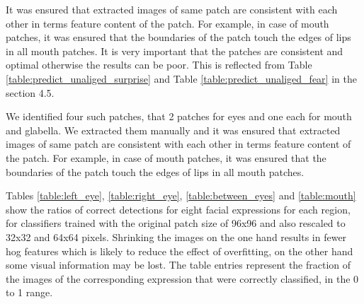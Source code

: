 It was ensured that extracted images of same patch are consistent with each other in terms feature content of the patch. For example, in case of mouth patches, it was ensured that the boundaries of the patch touch the edges of lips in all mouth patches.  It is very important that the patches are consistent and optimal otherwise the results can be poor. This is reflected from Table \ref{table:predict_unaliged_surprise} and Table \ref{table:predict_unaliged_fear} in the section 4.5.


We identified four such patches, that 2 patches for eyes and one each for mouth and glabella. We extracted them manually and it was ensured that extracted images of same patch are consistent with each other in terms feature content of the patch. For example, in case of mouth patches, it was ensured that the boundaries of the patch touch the edges of lips in all mouth patches.

Tables \ref{table:left_eye}, \ref{table:right_eye}, \ref{table:between_eyes} and \ref{table:mouth} show the ratios of correct detections for eight facial expressions for each region, for classifiers trained
with the original patch size of 96x96 and also rescaled to 32x32 and 64x64 pixels. Shrinking the images on the one hand results in fewer hog features which is likely to reduce the effect of overfitting, on the other hand some visual information may be lost. The table entries represent the fraction of the images of the corresponding expression that were correctly classified, in the 0 to 1 range.



